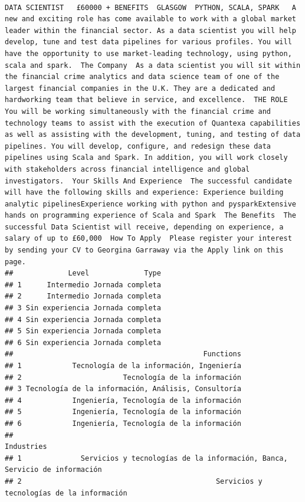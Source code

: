 \documentclass[
]{article}
\begin{document}
\begin{verbatim}
                                                                                                                                                                                                                                      DATA SCIENTIST   £60000 + BENEFITS  GLASGOW  PYTHON, SCALA, SPARK   A new and exciting role has come available to work with a global market leader within the financial sector. As a data scientist you will help develop, tune and test data pipelines for various profiles. You will have the opportunity to use market-leading technology, using python, scala and spark.  The Company  As a data scientist you will sit within the financial crime analytics and data science team of one of the largest financial companies in the U.K. They are a dedicated and hardworking team that believe in service, and excellence.  THE ROLE   You will be working simultaneously with the financial crime and technology teams to assist with the execution of Quantexa capabilities as well as assisting with the development, tuning, and testing of data pipelines. You will develop, configure, and redesign these data pipelines using Scala and Spark. In addition, you will work closely with stakeholders across financial intelligence and global investigators.  Your Skills And Experience  The successful candidate will have the following skills and experience: Experience building analytic pipelinesExperience working with python and pysparkExtensive hands on programming experience of Scala and Spark  The Benefits  The successful Data Scientist will receive, depending on experience, a salary of up to £60,000  How To Apply  Please register your interest by sending your CV to Georgina Garraway via the Apply link on this page.
##             Level             Type
## 1      Intermedio Jornada completa
## 2      Intermedio Jornada completa
## 3 Sin experiencia Jornada completa
## 4 Sin experiencia Jornada completa
## 5 Sin experiencia Jornada completa
## 6 Sin experiencia Jornada completa
##                                             Functions
## 1            Tecnología de la información, Ingeniería
## 2                        Tecnología de la información
## 3 Tecnología de la información, Análisis, Consultoría
## 4            Ingeniería, Tecnología de la información
## 5            Ingeniería, Tecnología de la información
## 6            Ingeniería, Tecnología de la información
##                                                                               Industries
## 1              Servicios y tecnologías de la información, Banca, Servicio de información
## 2                                              Servicios y tecnologías de la información

\end{verbatim}
\end{document}
